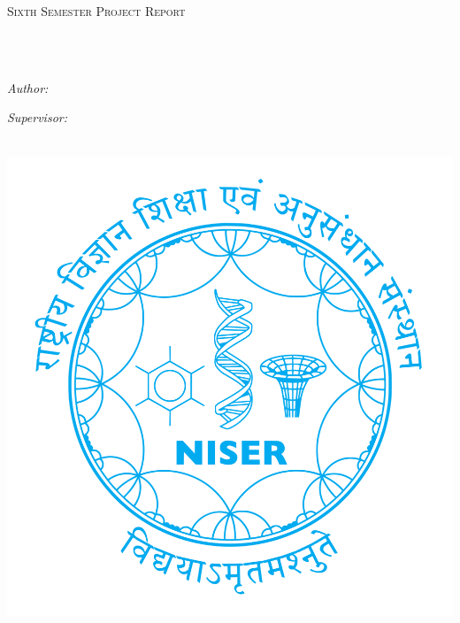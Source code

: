 \documentclass[12pt,oneside,english,singlespacing,headsepline]{thesis}
\author{Ashish \textsc{Panigrahi}}
\begin{document}
\frontmatter

\pagestyle{plain}

\begin{titlepage}
\begin{center}

\vspace*{.06\textheight}
{\scshape\LARGE \univname\par}\vspace{1.5cm}
\textsc{\Large Sixth Semester Project Report}\\[0.5cm]

\HRule \\[0.4cm]
{\huge \bfseries \ttitle\par}\vspace{0.4cm}
\HRule \\[1.5cm]

\begin{minipage}[t]{0.4\textwidth}
\begin{flushleft} \large
\emph{Author:}\\
{\authorname}
\end{flushleft}
\end{minipage}
\begin{minipage}[t]{0.4\textwidth}
\begin{flushright} \large
\emph{Supervisor:} \\
{\supname}
\end{flushright}
\end{minipage}\\[2cm]

\includegraphics[scale=0.1]{niser-logo.png}


\end{center}
\end{titlepage}
\end{document}
